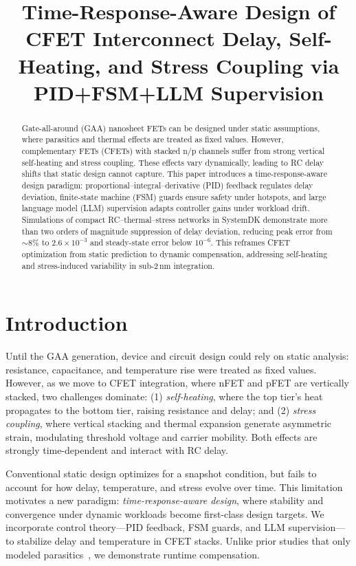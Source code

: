 \documentclass[conference]{IEEEtran}
\title{Time-Response-Aware Design of CFET Interconnect Delay, Self-Heating, and Stress Coupling via PID+FSM+LLM Supervision}
\author{
  \IEEEauthorblockN{Shinichi Samizo}
  \IEEEauthorblockA{Independent Semiconductor Researcher\\
  Project Design Hub, Samizo-AITL\\
  \textit{Email:} \href{mailto:shin3t72@gmail.com}{shin3t72@gmail.com}\quad
  \textit{GitHub:} \href{https://github.com/Samizo-AITL}{Samizo-AITL}}
}
\begin{document}
\maketitle

\begin{abstract}
Gate-all-around (GAA) nanosheet FETs can be designed under static assumptions, where parasitics and thermal effects are treated as fixed values. However, complementary FETs (CFETs) with stacked n/p channels suffer from strong vertical self-heating and stress coupling. These effects vary dynamically, leading to RC delay shifts that static design cannot capture. This paper introduces a time-response-aware design paradigm: proportional--integral--derivative (PID) feedback regulates delay deviation, finite-state machine (FSM) guards ensure safety under hotspots, and large language model (LLM) supervision adapts controller gains under workload drift. Simulations of compact RC--thermal--stress networks in SystemDK demonstrate more than two orders of magnitude suppression of delay deviation, reducing peak error from $\sim$8\% to $2.6\times 10^{-3}$ and steady-state error below $10^{-6}$. This reframes CFET optimization from static prediction to dynamic compensation, addressing self-heating and stress-induced variability in sub-2\,nm integration.
\end{abstract}

\section{Introduction}
Until the GAA generation, device and circuit design could rely on static analysis: resistance, capacitance, and temperature rise were treated as fixed values. However, as we move to CFET integration, where nFET and pFET are vertically stacked, two challenges dominate: (1) \emph{self-heating}, where the top tier's heat propagates to the bottom tier, raising resistance and delay; and (2) \emph{stress coupling}, where vertical stacking and thermal expansion generate asymmetric strain, modulating threshold voltage and carrier mobility. Both effects are strongly time-dependent and interact with RC delay.

Conventional static design optimizes for a snapshot condition, but fails to account for how delay, temperature, and stress evolve over time. This limitation motivates a new paradigm: \emph{time-response-aware design}, where stability and convergence under dynamic workloads become first-class design targets. We incorporate control theory---PID feedback, FSM guards, and LLM supervision---to stabilize delay and temperature in CFET stacks. Unlike prior studies that only modeled parasitics~\cite{yakimets2020cfet,irds2023}, we demonstrate runtime compensation.
\end{document}
